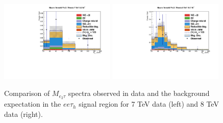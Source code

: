 \begin{figure}
\begin{center}
  \includegraphics[width=0.49\textwidth]{4_Analisys/pics/7TeV/plots/eet/LTCut_7TeV/final-subMass-LTCut_7TeV.pdf}
  \includegraphics[width=0.49\textwidth]{4_Analisys/pics/8TeV/plots/eet/LTCut_8TeV/final-subMass-LTCut_8TeV.pdf}\\
  \caption{
  Comparison of $M_{e_2\tau}$ spectra observed in data and the background expectation %
  in the $ee\tau_h$ signal region for 7 TeV data (left) and 8 TeV data (right).
  }
  \label{fig:LLT_eet_prefit}
\end{center}
\end{figure}


\begin{table}
\caption{Expected event yields for the different background processes and for a 125 GeV WH, $\rm{H}\To\tau\tau$ signal compared to the number of events observed in the data, split by channel and category, for 8 TeV data. The uncertainty quoted in each background process represents statistical plus systematic uncertainty.
}

\label{tab:prefit_yields_table_8TeV}
\end{table}

